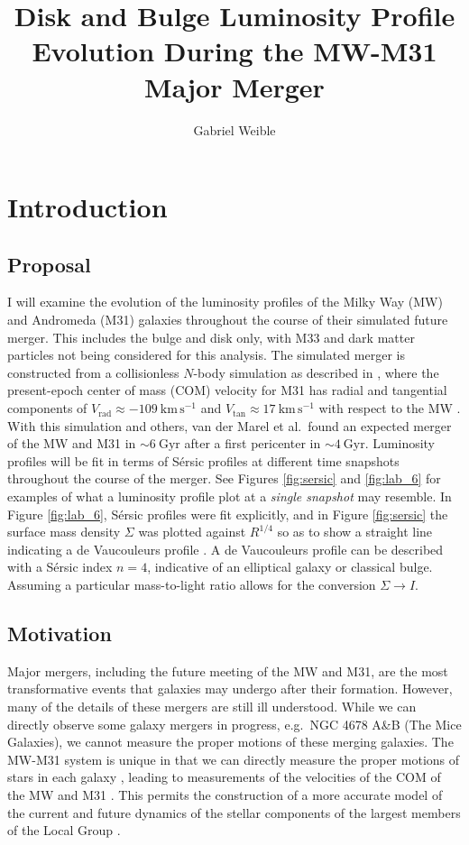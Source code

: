 \documentclass[twocolumn]{aastex631}
\begin{document}
\title{Disk and Bulge Luminosity Profile Evolution During the MW-M31 Major Merger}
\author{Gabriel Weible}

\section{Introduction}
\subsection{Proposal}
I will examine the evolution of the luminosity profiles of the Milky Way (MW) and Andromeda (M31) galaxies throughout the course of their simulated future merger. This includes the bulge and disk only, with M33 and dark matter particles not being considered for this analysis. The simulated merger is constructed from a collisionless $N$-body simulation as described in \cite{paper3}, where the present-epoch center of mass (COM) velocity for M31 has radial and tangential components of $V_\mathrm{rad} \approx -109 \ \mathrm{km} \, \mathrm{s}^{-1}$ and $V_\mathrm{tan} \approx 17 \ \mathrm{km} \, \mathrm{s}^{-1}$ with respect to the MW \citep{paper2}. With this simulation and others, van der Marel et al.~found an expected merger of the MW and M31 in ${\sim}6 \ \mathrm{Gyr}$ after a first pericenter in ${\sim}4 \ \mathrm{Gyr}$. Luminosity profiles will be fit in terms of S\'{e}rsic profiles \citep{sersic1963, sersic1968} at different time snapshots throughout the course of the merger. See Figures \ref{fig:sersic} and \ref{fig:lab_6} for examples of what a luminosity profile plot at a \emph{single snapshot} may resemble. In Figure \ref{fig:lab_6}, S\'{e}rsic profiles were fit explicitly, and in Figure \ref{fig:sersic} the surface mass density $\Sigma$ was plotted against $R^{1/4}$ so as to show a straight line indicating a de Vaucouleurs profile \citep{deVaucouleurs1948}. A de Vaucouleurs profile can be described with a S\'{e}rsic index $n = 4$, indicative of an elliptical galaxy or classical bulge. Assuming a particular mass-to-light ratio allows for the conversion $\Sigma \to I$.

\subsection{Motivation}
Major mergers, including the future meeting of the MW and M31, are the most transformative events that galaxies may undergo after their formation. However, many of the details of these mergers are still ill understood. While we can directly observe some galaxy mergers in progress, e.g.~NGC 4678 A\&B (The Mice Galaxies), we cannot measure the proper motions of these merging galaxies. The MW-M31 system is unique in that we can directly measure the proper motions of stars in each galaxy \citep{paper1}, leading to measurements of the velocities of the COM of the MW and M31 \citep{paper2}. This permits the construction of a more accurate model of the current and future dynamics of the stellar components of the largest members of the Local Group \citep{paper3}.
\end{document}
